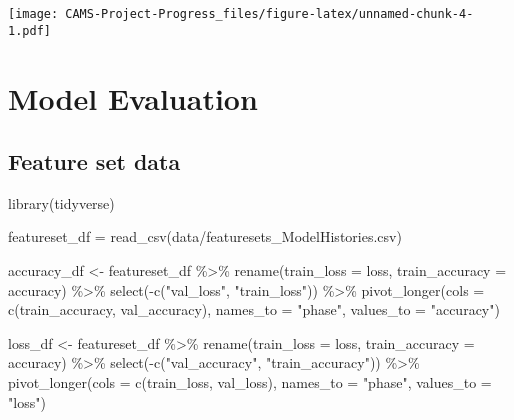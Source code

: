 \documentclass[
]{book}
\newenvironment{Shaded}{\begin{snugshade}}{\end{snugshade}}
\newcommand{\AttributeTok}[1]{\textcolor[rgb]{0.77,0.63,0.00}{#1}}
\newcommand{\FunctionTok}[1]{\textcolor[rgb]{0.00,0.00,0.00}{#1}}
\newcommand{\NormalTok}[1]{#1}
\newcommand{\OtherTok}[1]{\textcolor[rgb]{0.56,0.35,0.01}{#1}}
\newcommand{\SpecialCharTok}[1]{\textcolor[rgb]{0.00,0.00,0.00}{#1}}
\newcommand{\StringTok}[1]{\textcolor[rgb]{0.31,0.60,0.02}{#1}}
\begin{document}
\texttt{[image: CAMS-Project-Progress\_files/figure-latex/unnamed-chunk-4-1.pdf]}

\hypertarget{evaluation}{%
\chapter{Model Evaluation}\label{evaluation}}

\hypertarget{feature-set-data}{%
\section{Feature set data}\label{feature-set-data}}

\begin{Shaded}
\begin{Highlighting}[]
\FunctionTok{library}\NormalTok{(tidyverse)}
\end{Highlighting}
\end{Shaded}

\begin{Shaded}
\begin{Highlighting}[]
\NormalTok{featureset\_df }\OtherTok{=} \FunctionTok{read\_csv}\NormalTok{(}\StringTok{\textquotesingle{}data/featuresets\_ModelHistories.csv\textquotesingle{}}\NormalTok{)}

\NormalTok{accuracy\_df }\OtherTok{\textless{}{-}}\NormalTok{ featureset\_df }\SpecialCharTok{\%\textgreater{}\%}
  \FunctionTok{rename}\NormalTok{(}\AttributeTok{train\_loss =}\NormalTok{ loss, }\AttributeTok{train\_accuracy =}\NormalTok{ accuracy) }\SpecialCharTok{\%\textgreater{}\%}
  \FunctionTok{select}\NormalTok{(}\SpecialCharTok{{-}}\FunctionTok{c}\NormalTok{(}\StringTok{"val\_loss"}\NormalTok{, }\StringTok{"train\_loss"}\NormalTok{)) }\SpecialCharTok{\%\textgreater{}\%}
  \FunctionTok{pivot\_longer}\NormalTok{(}\AttributeTok{cols =} \FunctionTok{c}\NormalTok{(train\_accuracy, val\_accuracy), }\AttributeTok{names\_to =} \StringTok{"phase"}\NormalTok{, }\AttributeTok{values\_to =} \StringTok{"accuracy"}\NormalTok{)}

\NormalTok{loss\_df }\OtherTok{\textless{}{-}}\NormalTok{ featureset\_df }\SpecialCharTok{\%\textgreater{}\%}
  \FunctionTok{rename}\NormalTok{(}\AttributeTok{train\_loss =}\NormalTok{ loss, }\AttributeTok{train\_accuracy =}\NormalTok{ accuracy) }\SpecialCharTok{\%\textgreater{}\%}
  \FunctionTok{select}\NormalTok{(}\SpecialCharTok{{-}}\FunctionTok{c}\NormalTok{(}\StringTok{"val\_accuracy"}\NormalTok{, }\StringTok{"train\_accuracy"}\NormalTok{)) }\SpecialCharTok{\%\textgreater{}\%}
  \FunctionTok{pivot\_longer}\NormalTok{(}\AttributeTok{cols =} \FunctionTok{c}\NormalTok{(train\_loss, val\_loss), }\AttributeTok{names\_to =} \StringTok{"phase"}\NormalTok{, }\AttributeTok{values\_to =} \StringTok{"loss"}\NormalTok{)}
\end{Highlighting}
\end{Shaded}
\end{document}
